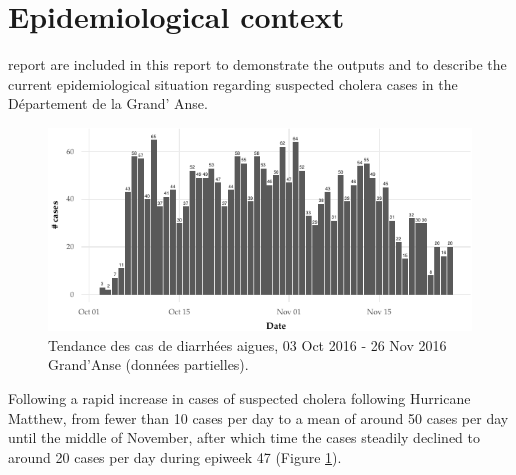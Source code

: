 \documentclass[]{tufte-handout}
\begin{document}
\section{Epidemiological context}\label{epidemiological-context}

 report are included in this
report to demonstrate the outputs and to describe the current
epidemiological situation regarding suspected cholera cases in the
Département de la Grand' Anse.

\begin{figure}
\includegraphics{rapport_final_files/figure-latex/epicurve_all-1} \caption[Tendance des cas de diarrhées aigues, 03 Oct 2016 - 26 Nov 2016 Grand’Anse (données partielles)]{Tendance des cas de diarrhées aigues, 03 Oct 2016 - 26 Nov 2016 Grand’Anse (données partielles).}\label{fig:epicurve_all}
\end{figure}

Following a rapid increase in cases of suspected cholera following
Hurricane Matthew, from fewer than 10 cases per day to a mean of around
50 cases per day until the middle of November, after which time the
cases steadily declined to around 20 cases per day during epiweek 47
(Figure \ref{fig:epicurve_all}).

\clearpage
\end{document}
